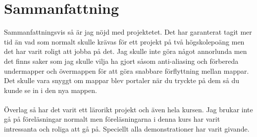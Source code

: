 \section{Sammanfattning}
Sammanfattningsvis så är jag nöjd med projektetet. Det har garanterat tagit mer tid än vad som normalt skulle krävas för ett projekt på två högskolepoäng men det har varit roligt att jobba på det. Jag skulle inte göra något annorlunda men det finns saker som jag skulle vilja ha gjort såsom anti-aliasing och förbereda undermapper och övermappen för att göra snabbare förflyttning mellan mappar. Det skulle vara snyggt om mappar blev portaler när du tryckte på dem så du kunde se in i den nya mappen. 
\\
\\
Överlag så har det varit ett lärorikt projekt och även hela kursen. Jag brukar inte gå på föreläsningar normalt men föreläsningarna i denna kurs har varit intressanta och roliga att gå på. Speciellt alla demonstrationer har varit givande.